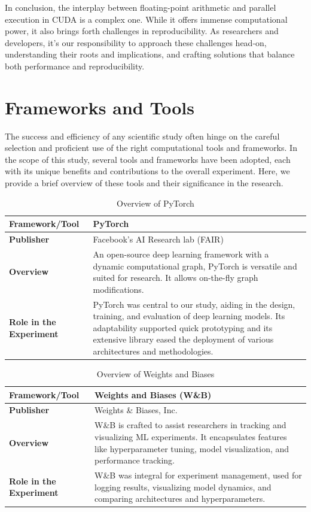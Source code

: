 In conclusion, the interplay between floating-point arithmetic and parallel execution in CUDA is a complex one. While it offers immense computational power, it also brings forth challenges in reproducibility. As researchers and developers, it's our responsibility to approach these challenges head-on, understanding their roots and implications, and crafting solutions that balance both performance and reproducibility.

\section{Frameworks and Tools}
The success and efficiency of any scientific study often hinge on the careful selection and proficient use of the right computational tools and frameworks. In the scope of this study, several tools and frameworks have been adopted, each with its unique benefits and contributions to the overall experiment. Here, we provide a brief overview of these tools and their significance in the research.

\begin{table}[h]
    \centering
    \renewcommand{\arraystretch}{1.5}
    \begin{tabular}{|l|p{10cm}|}
    \hline
    \textbf{Framework/Tool} & \textbf{PyTorch} \\
    \hline
    \textbf{Publisher} & Facebook's AI Research lab (FAIR) \\
    \hline
    \textbf{Overview} & An open-source deep learning framework with a dynamic computational graph, PyTorch is versatile and suited for research. It allows on-the-fly graph modifications. \\
    \hline
    \textbf{Role in the Experiment} & PyTorch was central to our study, aiding in the design, training, and evaluation of deep learning models. Its adaptability supported quick prototyping and its extensive library eased the deployment of various architectures and methodologies. \\
    \hline
    \end{tabular}
    \caption{Overview of PyTorch}
\end{table}

\begin{table}[h]
    \centering
    \renewcommand{\arraystretch}{1.5}
    \begin{tabular}{|l|p{10cm}|}
    \hline
    \textbf{Framework/Tool} & \textbf{Weights and Biases (W\&B)} \\
    \hline
    \textbf{Publisher} & Weights \& Biases, Inc. \\
    \hline
    \textbf{Overview} & W\&B is crafted to assist researchers in tracking and visualizing ML experiments. It encapsulates features like hyperparameter tuning, model visualization, and performance tracking. \\
    \hline
    \textbf{Role in the Experiment} & W\&B was integral for experiment management, used for logging results, visualizing model dynamics, and comparing architectures and hyperparameters. \\
    \hline
    \end{tabular}
    \caption{Overview of Weights and Biases}
\end{table}

